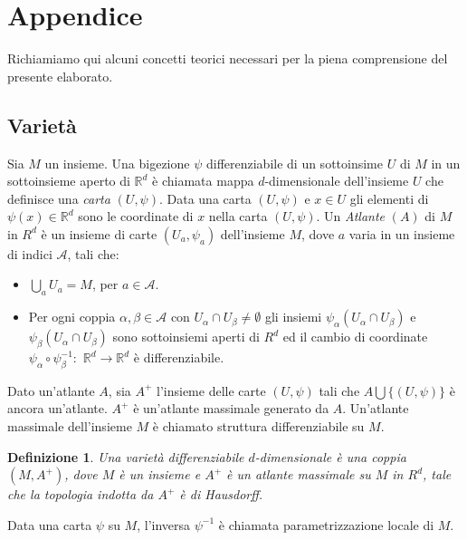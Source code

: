 \documentclass[a4paper, 12pt]{article}
\newtheorem{definition}{Definizione}
\begin{document}
\section{Appendice}
Richiamiamo qui alcuni concetti teorici necessari per la piena comprensione del presente elaborato.
\subsection{Varietà}
Sia $M$ un insieme. Una bigezione $\psi$ differenziabile di un sottoinsime $U$ di $M$ in un sottoinsieme aperto di $\mathbb{R}^d$ è chiamata mappa $d$-dimensionale dell'insieme $U$ che definisce una \textit{carta} $(U, \psi)$. Data una carta $(U, \psi)$ e $x \in U$ gli elementi di $\psi(x) \in \mathbb{R}^d$ sono le coordinate di $x$ nella carta $(U, \psi)$. Un \textit{Atlante} $(A)$ di $M$ in $R^d$ è un insieme di carte $(U_a, \psi_a)$ dell'insieme $M$, dove $a$ varia in un insieme di indici $\mathcal{A}$, tali che:
\begin{itemize}
    \item $\bigcup_a U_a = M$, per $a \in \mathcal{A}$.
    \item Per ogni coppia $\alpha, \beta \in \mathcal{A}$ con $U_{\alpha} \cap U_{\beta} \neq \emptyset$ gli insiemi $\psi_{\alpha}(U_{\alpha} \cap U_{\beta})$ e $\psi_{\beta}(U_{\alpha} \cap U_{\beta})$ sono sottoinsiemi aperti di $R^d$ ed il cambio di coordinate $\psi_{\alpha} \circ \psi_{\beta}^{-1}:$ $\mathbb{R}^d \to \mathbb{R}^d$ è differenziabile.
\end{itemize}
Dato un'atlante $A$, sia $A^+$ l'insieme delle carte $(U, \psi)$ tali che $A \bigcup \{(U, \psi)\}$ è ancora un'atlante. $A^+$ è un'atlante massimale generato da $A$. Un'atlante massimale dell'insieme $M$ è chiamato struttura differenziabile su $M$.
\begin{definition}
Una varietà differenziabile $d$-dimensionale è una coppia $(M, A^+)$, dove $M$ è un insieme e $A^+$ è un atlante massimale su $M$ in $R^d$, tale che la topologia indotta da $A^+$ è di Hausdorff.
\end{definition}
Data una carta $\psi$ su $M$, l'inversa $\psi^{-1}$ è chiamata parametrizzazione locale di $M$.
\end{document}
